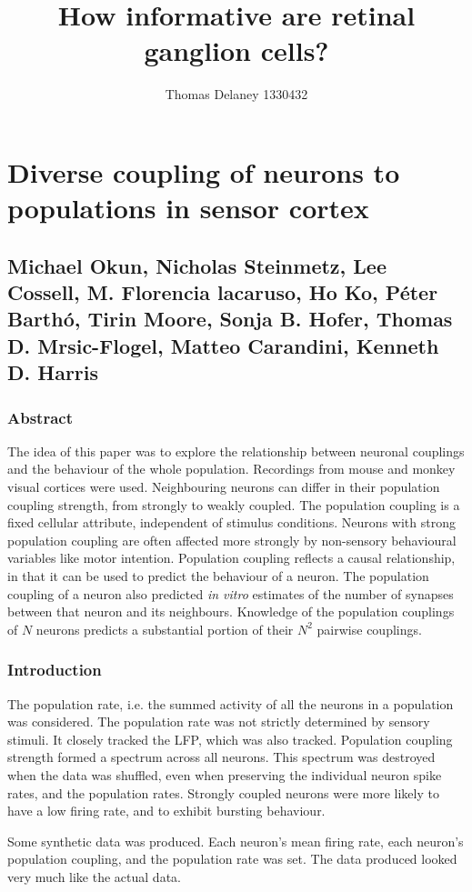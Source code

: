 \documentclass[a4paper,12pt]{article}
\title{How informative are retinal ganglion cells?}
\author{Thomas Delaney 1330432}
\theoremstyle{definition}
\begin{document}
\section*{Diverse coupling of neurons to populations in sensor cortex}
\subsection*{Michael Okun, Nicholas Steinmetz, Lee Cossell, M. Florencia lacaruso, Ho Ko, P\'eter Barth\'o, Tirin Moore, Sonja B. Hofer, Thomas D. Mrsic-Flogel, Matteo Carandini, Kenneth D. Harris}
\subsubsection*{Abstract}
	The idea of this paper was to explore the relationship between neuronal couplings and the behaviour of the whole population. Recordings from mouse and monkey visual cortices were used. Neighbouring neurons can differ in their population coupling strength, from strongly to weakly coupled. The population coupling is a fixed cellular attribute, independent of stimulus conditions. Neurons with strong population coupling are often affected more strongly by non-sensory behavioural variables like motor intention. Population coupling reflects a causal relationship, in that it can be used to predict the behaviour of a neuron. The population coupling of a neuron also predicted \textit{in vitro} estimates of the number of synapses between that neuron and its neighbours. Knowledge of the population couplings of $N$ neurons predicts a substantial portion of their $N^2$ pairwise couplings. 
	
\subsubsection*{Introduction}
The population rate, i.e. the summed activity of all the neurons in a population was considered. The population rate was not strictly determined by sensory stimuli. It closely tracked the LFP, which was also tracked. Population coupling strength formed a spectrum across all neurons. This spectrum was destroyed when the data was shuffled, even when preserving the individual neuron spike rates, and the population rates. Strongly coupled neurons were more likely to have a low firing rate, and to exhibit bursting behaviour.

Some synthetic data was produced. Each neuron's mean firing rate, each neuron's population coupling, and the population rate was set. The data produced looked very much like the actual data. 
\end{document}
